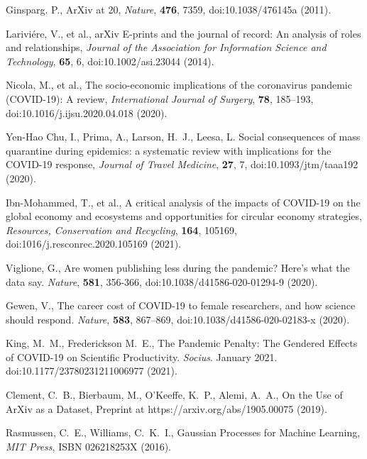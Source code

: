 \documentclass[]{rsos}%
\begin{document}
\begin{thebibliography}{10}

{Ginsparg}. P., {ArXiv at 20}, \emph{Nature}, \textbf{476}, 7359, doi:10.1038/476145a \newblock (2011).

{Larivi{\'e}re, V., et al.,} {arXiv E-prints and the journal of record: An analysis of roles and relationships}, \emph{Journal of the Association for Information Science and Technology}, \textbf{65}, 6, doi:10.1002/asi.23044 \newblock (2014).


{Nicola, M., et al.,} {The socio-economic implications of the coronavirus pandemic ({COVID}-19): A review}, \emph{International Journal of Surgery}, \textbf{78}, 185--193, doi:10.1016/j.ijsu.2020.04.018 \newblock (2020).

{Yen-Hao Chu, I., Prima, A., Larson, H.~J., Leesa, L.}
{Social consequences of mass quarantine during epidemics: a systematic review with implications for the {COVID}-19 response}, \emph{Journal of Travel Medicine}, \textbf{27}, 7, doi:10.1093/jtm/taaa192 \newblock (2020).

{Ibn-Mohammed, T., et al.,} {A critical analysis of the impacts of {COVID}-19 on the global economy and ecosystems and opportunities for circular economy strategies}, \emph{Resources, Conservation and Recycling}, \textbf{164}, 105169, doi:1016/j.resconrec.2020.105169 \newblock (2021).


{Viglione, G.}, {Are women publishing less during the pandemic? Here's what the data say}. \emph{Nature}, \textbf{581}, 356-366, doi:10.1038/d41586-020-01294-9 \newblock (2020).


{Gewen, V.}, {The career cost of COVID-19 to female researchers, and how science should respond}. \emph{Nature}, \textbf{583}, 867--869, doi:10.1038/d41586-020-02183-x \newblock (2020).



{King, M.~M., Frederickson M.~E.}, {The Pandemic Penalty: The Gendered Effects of COVID-19 on Scientific Productivity}. \emph{Socius}. January 2021. doi:10.1177/23780231211006977 \newblock (2021).  


{Clement, C.~B., Bierbaum, M., O'Keeffe, K.~P., Alemi, A.~A.,}
{On the Use of ArXiv as a Dataset},
Preprint at https://arxiv.org/abs/1905.00075 \newblock (2019).

{Rasmussen, C.~E., Williams, C.~K.~I.,}
{Gaussian Processes for Machine Learning}, \emph{MIT Press}, ISBN 026218253X \newblock (2016).


\end{thebibliography}
\end{document}
